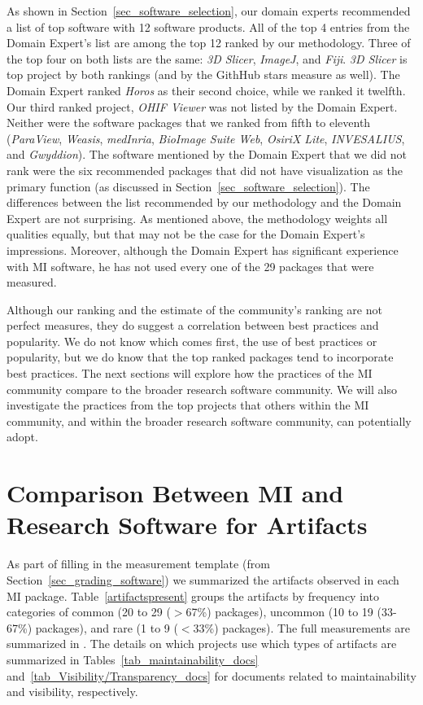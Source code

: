 \documentclass[final, 3p, times, authoryear]{elsarticle}
\begin{document}
As shown in Section~\ref{sec_software_selection}, our domain experts recommended
a list of top software with 12 software products.  All of the top 4 entries from
the Domain Expert's list are among the top 12 ranked by our methodology. Three
of the top four on both lists are the same: \textit{3D Slicer}, \textit{ImageJ},
and \textit{Fiji}. \textit{3D Slicer} is top project by both rankings (and by
the GithHub stars measure as well).  The Domain Expert ranked \textit{Horos} as
their second choice, while we ranked it twelfth.  Our third ranked project,
\textit{OHIF Viewer} was not listed by the Domain Expert.  Neither were the
software packages that we ranked from fifth to eleventh (\textit{ParaView},
\textit{Weasis}, \textit{medInria}, \textit{BioImage Suite Web}, \textit{OsiriX
Lite}, \textit{INVESALIUS}, and \textit{Gwyddion}).  The software mentioned by
the Domain Expert that we did not rank were the six recommended packages that
did not have visualization as the primary function (as discussed in
Section~\ref{sec_software_selection}).  The differences between the list
recommended by our methodology and the Domain Expert are not surprising.  As
mentioned above, the methodology weights all qualities equally, but that may not
be the case for the Domain Expert's impressions.  Moreover, although the Domain
Expert has significant experience with MI software, he has not used every one of
the 29 packages that were measured.

Although our ranking and the estimate of the community's ranking are not perfect
measures, they do suggest a correlation between best practices and popularity.
We do not know which comes first, the use of best practices or popularity, but
we do know that the top ranked packages tend to incorporate best practices. The
next sections will explore how the practices of the MI community compare to the
broader research software community. We will also investigate the practices from
the top projects that others within the MI community, and within the broader
research software community, can potentially adopt.

\section{Comparison Between MI and Research Software for Artifacts}
\label{Sec_CompareArtifacts}

As part of filling in the measurement template (from
Section~\ref{sec_grading_software}) we summarized the artifacts observed in each
MI package. Table~\ref{artifactspresent} groups the artifacts by frequency into
categories of common (20 to 29 ($>$67\%) packages), uncommon (10 to 19 (33-67\%)
packages), and rare (1 to 9 ($<$33\%) packages). The full measurements are
summarized in \citet{Dong2021-Data}.  The details on which projects use which
types of artifacts are summarized in Tables~\ref{tab_maintainability_docs}
and~\ref{tab_Visibility/Transparency_docs} for documents related to
maintainability and visibility, respectively.
\end{document}
